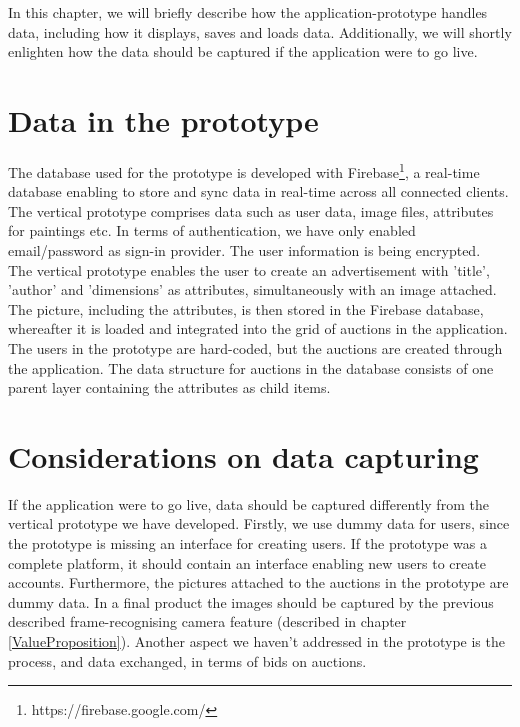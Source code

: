 In this chapter, we will briefly describe how the application-prototype handles data, including how it displays, saves and loads data. Additionally, we will shortly enlighten how the data should be captured if the application were to go live. 

\section{Data in the prototype}
The database used for the prototype is developed with Firebase\footnote{https://firebase.google.com/}, a real-time database enabling to store and sync data in real-time across all connected clients. The vertical prototype comprises data such as user data, image files, attributes for paintings etc. In terms of authentication, we have only enabled email/password as sign-in provider. The user information is being encrypted. \\

The vertical prototype enables the user to create an advertisement with 'title', 'author' and 'dimensions' as attributes, simultaneously with an image attached. The picture, including the attributes, is then stored in the Firebase database, whereafter it is loaded and integrated into the grid of auctions in the application. The users in the prototype are hard-coded, but the auctions are created through the application. The data structure for auctions in the database consists of one parent layer containing the attributes as child items. 

\section{Considerations on data capturing}
If the application were to go live, data should be captured differently from the vertical prototype we have developed. Firstly, we use dummy data for users, since the prototype is missing an interface for creating users. If the prototype was a complete platform, it should contain an interface enabling new users to create accounts. Furthermore, the pictures attached to the auctions in the prototype are dummy data. In a final product the images should be captured by the previous described frame-recognising camera feature (described in chapter \ref{ValueProposition}). Another aspect we haven't addressed in the prototype is the process, and data exchanged, in terms of bids on auctions. 